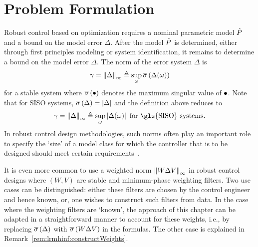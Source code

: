 \section{Problem Formulation}
\label{sec:lrmhinf:Problem}
Robust control based on \Hinf{} optimization requires a nominal parametric model $\hat{P}$ and a bound on the model error $\Delta$. 
After the model $\hat{P}$ is determined, either through first principles modeling or system identification, it remains to determine a bound on the model error $\Delta$.
The \Hinf{} norm of the error system $\Delta$ is
\begin{equation}
  \gamma 
     = 
       \left\| \Delta \right\|_{\infty} 
    \triangleq 
       \sup_{\omega} 
          \overline{\sigma} \left( \Delta(\omega) \right) 
  \label{eq:lrmhinf:HinfNorm}
\end{equation}
for a stable system where $ \overline{\sigma} \left( \bullet \right) $ denotes the maximum singular value of $\bullet$.
Note that for \gls{SISO} systems, $ \overline{\sigma} \left( \Delta \right)  = \left| \Delta \right|$ and the definition above reduces to
\begin{equation}
  \gamma 
    = 
       \infnorm{\Delta} 
    \isdef 
         \sup_{\omega} 
         \abs{\Delta(\omega)}
  \text{ for \gls{SISO} systems}
  \text{.}
  \label{eq:lrmhinf:HinfNormSISO}
\end{equation}
In robust control design methodologies, such \Hinf{} norms often play an important role to specify the `size' of a model class for which the controller that is to be designed should meet certain requirements~\citep{Skogestad2005}.

\begin{remark}
It is even more common to use a weighted norm $\left\| W \Delta V \right\|_{\infty}$ in robust control designs where $(W,V)$ are stable and minimum-phase weighting filters.
Two use cases can be distinguished: either these filters are chosen by the control engineer and hence known, or, one wishes to construct such filters from data.
In the case where the weighting filters are `known', the approach of this chapter can be adapted in a straightforward manner to account for these weights, i.e., by replacing $ \overline{\sigma} \left( \Delta \right) $ with $ \overline{\sigma} \left( W \Delta V \right) $ in the formulas.
The other case is explained in Remark~\ref{rem:lrmhinf:constructWeights}.
\end{remark}

